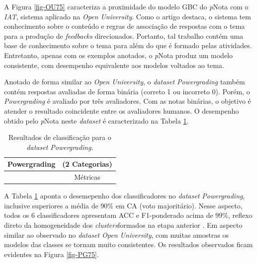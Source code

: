 A Figura \ref{fig-OU75} caracteriza a proximidade do modelo GBC do \textit{p}Nota com o \textit{IAT}, sistema aplicado na \textit{Open University}. Como o artigo destaca, o sistema tem conhecimento sobre o conteúdo e regras de associação de respostas com o tema para a produção de \textit{feedbacks} direcionados. Portanto, tal trabalho contém uma base de conhecimento sobre o tema para além do que é formado pelas atividades. Entretanto, apenas com os exemplos anotados, o \textit{p}Nota produz um modelo consistente, com desempenho equivalente aos modelos voltados ao tema.

Anotado de forma similar ao \textit{Open University}, o \textit{dataset Powergrading} também contém respostas avaliadas de forma binária (correto 1 ou incorreto 0). Porém, o \textit{Powergrading} é avaliado por três avaliadores. Com as notas binárias, o objetivo é atender o resultado coincidente entre os avaliadores humanos. O desempenho obtido pelo \textit{p}Nota neste \textit{dataset} é caracterizado na Tabela \ref{tab-PG75}.

\begin{table}[!h]
\begin{center}
\begin{tabular}{l r r r r r r r}
    \hline
    \multicolumn{7}{l}{\textbf{Powergrading}} &  (2 Categorias) \\ \hline
     & \multicolumn{7}{c}{M{\'e}tricas} \\ \cline{2-8}

    

    \hline
    \hline
\end{tabular}
\end{center}
\caption{Resultados de classificação para o \textit{dataset Powergrading}.}
\label{tab-PG75}
\end{table}

A Tabela \ref{tab-PG75} aponta o desemepenho dos classificadores no \textit{dataset Powergrading}, inclusive superiores a média de 90\% em CA (voto majoritário). Nesse aspecto, todos os 6 classificadores apresentam ACC e F1-ponderado acima de 99\%, reflexo direto da homogeneidade dos \textit{clusters}formados na etapa anterior \cite{basu2013}. Em aspecto similar ao observado no \textit{dataset Open University}, com muitas amostras os modelos das classes se tornam muito consistentes. Os resultados observados ficam evidentes na Figura \ref{fig-PG75}.

